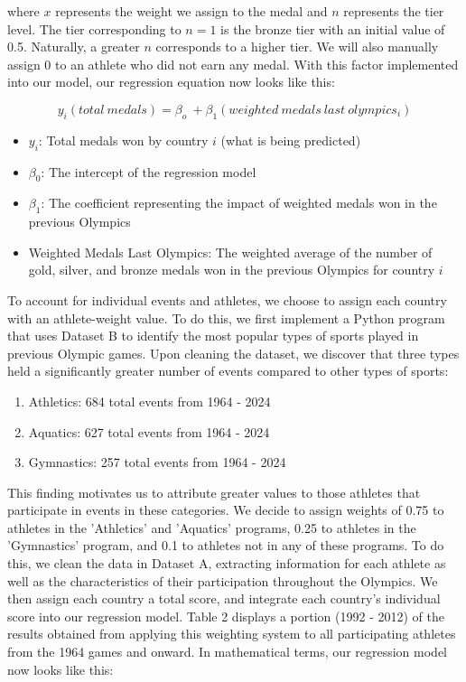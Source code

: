 \documentclass{mcmthesis}
\begin{document}
where $x$ represents the weight we assign to the medal and $n$ represents the tier level. The tier corresponding to $n = 1$ is the bronze tier with an initial value of 0.5. Naturally, a greater $n$ corresponds to a higher tier. We will also manually assign 0 to an athlete who did not earn any medal. With this factor implemented into our model, our regression equation now looks like this: 

\begin{equation}
y_i(total\ medals) = \beta_o \ + \beta_1 (weighted\ medals\ last\ olympics_i)
\end{equation} 

\begin{itemize}
    \item $y_i$: Total medals won by country $i$ (what is being predicted)
    \item $\beta_0$: The intercept of the regression model
    \item $\beta_1$: The coefficient representing the impact of weighted medals won in the previous Olympics
    \item Weighted Medals Last Olympics: The weighted average of the number of gold, silver, and bronze medals won in the previous Olympics for country $i$
\end{itemize}

\par
To account for individual events and athletes, we choose to assign each country with an athlete-weight value. To do this, we first implement a Python program that uses Dataset B to identify the most popular types of sports played in previous Olympic games. Upon cleaning the dataset, we discover that three types held a significantly greater number of events compared to other types of sports:
\begin{enumerate}
    \item Athletics: 684 total events from 1964 - 2024
    \item Aquatics: 627 total events from 1964 - 2024
    \item Gymnastics: 257 total events from 1964 - 2024
\end{enumerate} \par
This finding motivates us to attribute greater values to those athletes that participate in events in these categories. We decide to assign weights of 0.75 to athletes in the 'Athletics' and 'Aquatics' programs, 0.25 to athletes in the 'Gymnastics' program, and 0.1 to athletes not in any of these programs. To do this, we clean the data in Dataset A, extracting information for each athlete as well as the characteristics of their participation throughout the Olympics. We then assign each country a total score, and integrate each country's individual score into our regression model. Table 2 displays a portion (1992 - 2012) of the results obtained from applying this weighting system to all participating athletes from the 1964 games and onward. In mathematical terms, our regression model now looks like this: 
\end{document}
